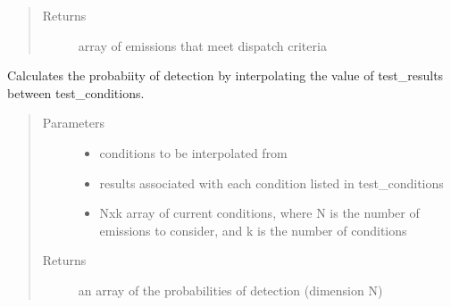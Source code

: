 \documentclass[letterpaper,10pt,english]{sphinxmanual}
\begin{document}
\begin{fulllineitems}
\begin{fulllineitems}
\begin{quote}
\begin{description}
\item[{Returns}] \leavevmode
array of emissions that meet dispatch criteria

\end{description}\end{quote}

\end{fulllineitems}


\begin{fulllineitems}
\label{\detokenize{index:feast.DetectionModules.abstract_detection_method.DetectionMethod.empirical_interpolator}}
Calculates the probabiity of detection by interpolating the value of test\_results between test\_conditions.
\begin{quote}\begin{description}
\item[{Parameters}] \leavevmode\begin{itemize}
\item {} 
 \textendash{} conditions to be interpolated from

\item {} 
 \textendash{} results associated with each condition listed in test\_conditions

\item {} 
 \textendash{} Nxk array of current conditions, where N is the number of emissions to consider,
and k is the number of conditions

\end{itemize}

\item[{Returns}] \leavevmode
an array of the probabilities of detection (dimension N)

\end{description}\end{quote}

\end{fulllineitems}



\end{fulllineitems}
\end{document}
